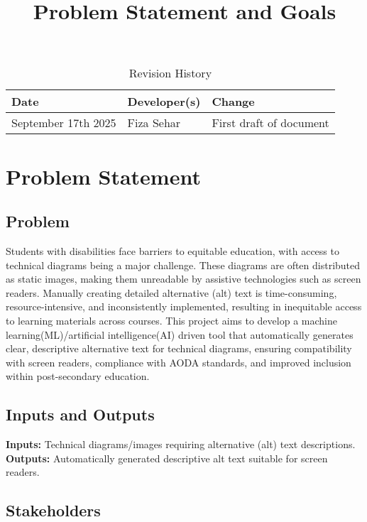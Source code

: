 \documentclass{article}
\title{Problem Statement and Goals\\\progname}
\author{\authname}
\date{}
\begin{document}
\maketitle

\begin{table}[hp]
\caption{Revision History} \label{TblRevisionHistory}
\begin{tabularx}{\textwidth}{llX}
\toprule
\textbf{Date} & \textbf{Developer(s)} & \textbf{Change}\\
\midrule
September 17th 2025 & Fiza Sehar & First draft of document\\
\bottomrule
\end{tabularx}
\end{table}

\section{Problem Statement}

\subsection{Problem}
Students with disabilities face barriers to equitable education, with access to technical diagrams being a major challenge. These diagrams are often distributed as static images, making them unreadable by assistive technologies such as screen readers. Manually creating detailed alternative (alt) text is time-consuming, resource-intensive, and inconsistently implemented, resulting in inequitable access to learning materials across courses. This project aims to develop a machine learning(ML)/artificial intelligence(AI) driven tool that automatically generates clear, descriptive alternative text for technical diagrams, ensuring compatibility with screen readers, compliance with AODA standards, and improved inclusion within post-secondary education.

\subsection{Inputs and Outputs}
\textbf{Inputs:} Technical diagrams/images requiring alternative (alt) text descriptions.\\
\textbf{Outputs:} Automatically generated descriptive alt text suitable for screen readers.
\subsection{Stakeholders}
\end{document}
